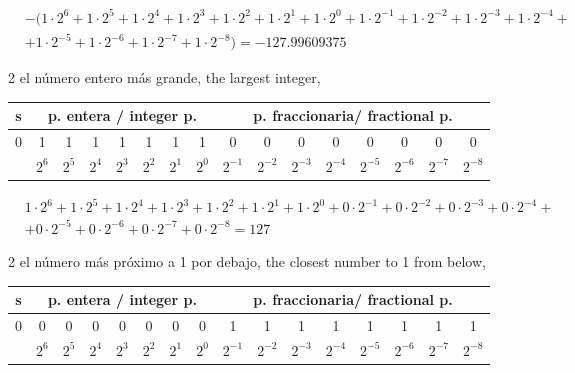 \begin{equation*}
\begin{split}
&-(1\cdot 2^6+1 \cdot 2^5+ 1\cdot 2^4+ 1 \cdot 2^3+ 1 \cdot 2^2 + 1 \cdot 2^1 + 1 \cdot 2^0 + 1 \cdot 2^{-1}+ 1 \cdot 2^{-2}+ 1 \cdot 2^{-3}+ 1 \cdot 2^{-4}+\\
&+ 1 \cdot 2^{-5}+1 \cdot 2^{-6} +1 \cdot 2^{-7}+ 1\cdot 2^{-8}) =  -127.99609375
\end{split}
\end{equation*}

\begin{paracol}{2}
el número entero más grande,
\switchcolumn
the largest integer,
\end{paracol}

\begin{center}
\begin{tabular}{|c||c|c|c|c|c|c|c||c|c|c|c|c|c|c|c|}
\hline
s&\multicolumn{7}{c||}{p. entera / integer p.}&\multicolumn{8}{c|}{p. fraccionaria/ fractional p.}\\
\hline
0&1&1&1&1&1&1&1&0&0&0&0&0&0&0&0\\
\hline
&$2^{6}$&$2^{5}$&$2^{4}$&$2^{3}$&$2^{2}$&$2^{1}$&$2^{0}$&$2^{-1}$&$2^{-2}$&$2^{-3}$&$2^{-4}$&$2^{-5}$&$2^{-6}$&$2^{-7}$&$2^{-8}$\\
\hline
\end{tabular}
\end{center}

\begin{equation*}
\begin{split}
&1\cdot 2^6+1 \cdot 2^5+ 1\cdot 2^4+ 1 \cdot 2^3+ 1 \cdot 2^2 + 1 \cdot 2^1 + 1 \cdot 2^0 + 0 \cdot 2^{-1}+ 0 \cdot 2^{-2}+ 0 \cdot 2^{-3}+ 0 \cdot 2^{-4}+\\
&+ 0 \cdot 2^{-5}+0 \cdot 2^{-6} +0 \cdot 2^{-7}+0\cdot 2^{-8} =  127
\end{split}
\end{equation*}

\begin{paracol}{2}
el número más próximo a 1 por debajo,
\switchcolumn
the closest number to 1 from below,
\end{paracol}

\begin{center}
\begin{tabular}{|c||c|c|c|c|c|c|c||c|c|c|c|c|c|c|c|}
\hline
s&\multicolumn{7}{c||}{p. entera / integer p.}&\multicolumn{8}{c|}{p. fraccionaria/ fractional p.}\\
\hline
0&0&0&0&0&0&0&0&1&1&1&1&1&1&1&1\\
\hline
&$2^{6}$&$2^{5}$&$2^{4}$&$2^{3}$&$2^{2}$&$2^{1}$&$2^{0}$&$2^{-1}$&$2^{-2}$&$2^{-3}$&$2^{-4}$&$2^{-5}$&$2^{-6}$&$2^{-7}$&$2^{-8}$\\
\hline
\end{tabular}
\end{center}

